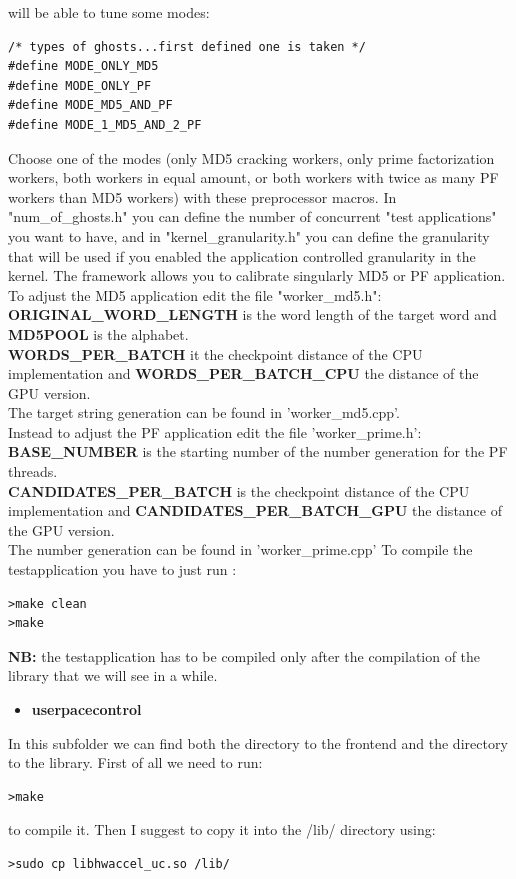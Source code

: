\documentclass[a4paper,13pt]{article}
\begin{document}
\begin{multicols}{2}
        will be able to tune some modes:
        \begin{lstlisting}
/* types of ghosts...first defined one is taken */
#define MODE_ONLY_MD5
#define MODE_ONLY_PF
#define MODE_MD5_AND_PF
#define MODE_1_MD5_AND_2_PF
        \end{lstlisting}
        Choose one of the modes (only MD5 cracking workers, only prime factorization workers, both workers in 
        equal amount, or both workers with twice as many PF workers than MD5 workers) with these preprocessor
        macros. In "num\_of\_ghosts.h" you can define the number of concurrent "test applications" you want to
        have, and in "kernel\_granularity.h" you can define the granularity that will be used if you enabled
        the application controlled granularity in the kernel.
        The framework allows you to calibrate singularly MD5 or PF application.
        To adjust the MD5 application edit the file "worker\_md5.h":\\
        {\bf ORIGINAL\_WORD\_LENGTH} is the word length of the target word and {\bf MD5POOL} is the alphabet.\\
        {\bf WORDS\_PER\_BATCH} it the checkpoint distance of the CPU implementation and {\bf WORDS\_PER\_BATCH\_CPU}
        the distance of the GPU version.\\
        The target string generation can be found in 'worker\_md5.cpp'.\\
        Instead to adjust the PF application edit the file 'worker\_prime.h':\\
        {\bf BASE\_NUMBER} is the starting number of the number generation for the PF threads.\\
        {\bf CANDIDATES\_PER\_BATCH} is the checkpoint distance of the CPU implementation and {\bf CANDIDATES\_PER\_BATCH\_GPU} 
        the distance of the GPU version.\\
        The number generation can be found in 'worker\_prime.cpp' 
        \newline
        To compile the testapplication you have to just run :
        \begin{lstlisting}
>make clean
>make 
        \end{lstlisting}
        {\bf NB:} the testapplication has to be compiled only after the compilation of the library that we will see
        in a while.
    \vspace{4ex}
    \begin{itemize}
        \item{{\bf userpacecontrol}}\\
    \end{itemize}
    \vspace{-2ex}
        In this subfolder we can find both the directory to the frontend and the directory to the library. First of 
        all we need to run:
\begin{lstlisting}
>make
\end{lstlisting}
        to compile it. Then I suggest to copy it into the /lib/ directory using:
\begin{lstlisting}
>sudo cp libhwaccel_uc.so /lib/
\end{lstlisting}


\end{multicols}
\end{document}
